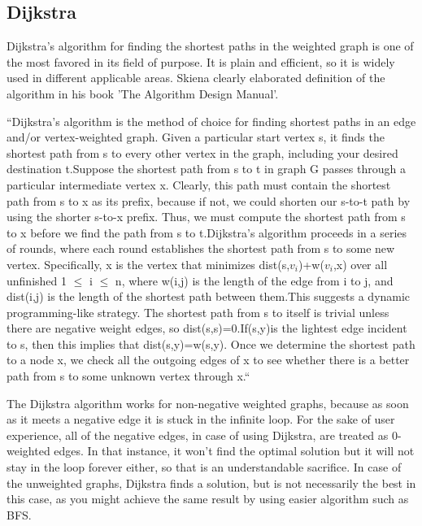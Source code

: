 \subsection{Dijkstra}

Dijkstra's algorithm for finding the shortest paths in the weighted graph is one of the most favored in its field of purpose. It is plain and efficient, so it is widely used in different applicable areas. Skiena clearly elaborated definition of the algorithm in his book 'The Algorithm Design Manual'.

``Dijkstra’s algorithm is the method of choice for finding shortest paths in an edge and/or vertex-weighted graph. Given a particular start vertex s, it finds the shortest path from s to every other vertex in the graph, including your desired destination t.Suppose the shortest path from s to t in graph G passes through a particular intermediate vertex x. Clearly, this path must contain the shortest path from s to x as its prefix, because if not, we could shorten our s-to-t path by using the shorter s-to-x prefix. Thus, we must compute the shortest path from s to x before we find the path from s to t.Dijkstra’s algorithm proceeds in a series of rounds, where each round establishes the shortest path from s to some new vertex. Specifically, x is the vertex that minimizes dist(s,$v_i$)+w($v_i$,x) over all unfinished 1 $\leq$ i $\leq$ n, where w(i,j) is the length of the edge from i to j, and dist(i,j) is the length of the shortest path between them.This suggests a dynamic programming-like strategy. The shortest path from s to itself is trivial unless there are negative weight edges, so dist(s,s)=0.If(s,y)is the lightest edge incident to s, then this implies that dist(s,y)=w(s,y). Once we determine the shortest path to a node x, we check all the outgoing edges of x to see whether there is a better path from s to some unknown vertex through x.``~\cite{skiena-algorithm-design}

The Dijkstra algorithm works for non-negative weighted graphs, because as soon as it meets a negative edge it is stuck in the infinite loop. For the sake of user experience, all of the negative edges, in case of using Dijkstra, are treated as 0-weighted edges. In that instance, it won't find the optimal solution but it will not stay in the loop forever either, so that is an understandable sacrifice. In case of the unweighted graphs, Dijkstra finds a solution, but is not necessarily the best in this case, as you might achieve the same result by using easier algorithm such as BFS.


